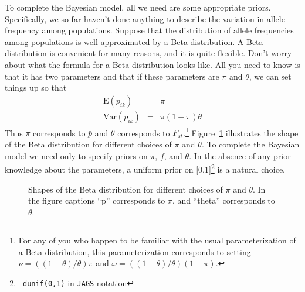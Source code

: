 To complete the Bayesian model, all we need are some appropriate
priors. Specifically, we so far haven't done anything to describe the
variation in allele frequency among populations. Suppose that the
distribution of allele frequencies among populations is
well-approximated by a Beta distribution. A Beta
distribution is convenient for many reasons, and it is quite
flexible. Don't worry about what the formula for a Beta distribution
looks like. All you need to know is that it has two parameters and
that if these parameters are $\pi$ and $\theta$, we can set things up
so that
\begin{eqnarray*}
\mbox{E}(p_{ik}) &=& \pi \\
\mbox{Var}(p_{ik}) &=& \pi(1-\pi)\theta
\end{eqnarray*}
Thus $\pi$ corresponds to $\bar p$ and $\theta$ corresponds to
$F_{st}$.\footnote{For any of you who happen to be familiar with the
usual parameterization of a Beta distribution, this parameterization
corresponds to setting $\nu = ((1-\theta)/\theta)\pi$ and $\omega =
((1-\theta)/\theta)(1-\pi)$.} Figure~\ref{fig:beta} illustrates the
shape of the Beta distribution for different choices of $\pi$ and
$\theta$. To complete the Bayesian model we need only to specify
priors on $\pi$, $f$, and $\theta$. In the absence of any prior
knowledge about the parameters, a uniform prior on [0,1]\footnote{{\tt
dunif(0,1)} in {\tt JAGS} notation} is a natural choice.
\begin{figure}
\caption{Shapes of the Beta distribution for different choices of
  $\pi$ and $\theta$. In the figure captions ``p'' corresponds to $\pi$,
  and ``theta'' corresponds to $\theta$.}\label{fig:beta}
\end{figure}

